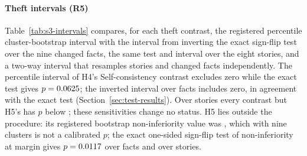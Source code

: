 \paragraph{Theft intervals (R5)}
Table~\ref{tab:s3-intervals} compares, for each theft contrast, the registered percentile cluster-bootstrap interval with the interval from inverting the exact sign-flip test over the nine changed facts, the same test and interval over the eight stories, and a two-way interval that resamples stories and changed facts independently. The percentile interval of H4's Self-consistency contrast excludes zero while the exact test gives $p=0.0625$; the inverted interval over facts includes zero, in agreement with the exact test (Section~\ref{sec:test-results}). Over stories every contrast but H5's has $p$ below \sthreeAlpha; these sensitivities change no status. H5 lies outside the procedure: its registered bootstrap non-inferiority value was \sthreeHFivePCell, which with nine clusters is not a calibrated $p$; the exact one-sided sign-flip test of non-inferiority at margin \sthreeHFiveMargin{} gives $p=0.0117$ over facts and \sthreeRFiveHFiveNIStoriesP{} over stories.

